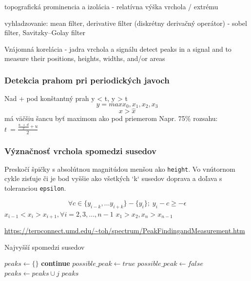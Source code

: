 topografická prominencia a izolácia - relatívna výška vrchola / extrému

vyhladzovanie: mean filter, derivative filter (diskrétny derivačný operátor) - sobel filter, Savitzky–Golay filter
\cite{spectrometry-peak-detection}

Vzájomná korelácia - jadra vrchola a signálu
detect peaks in a signal and to measure their positions, heights, widths, and/or areas


\subsubsection{Detekcia prahom pri periodických javoch}
Nad + pod konštantný prah y < t, y > t
$$ y = max{x_0, x_1, x_2, x_3}$$
$$ x > \hat{x} $$ má väčšiu šancu byť maximom ako pod priemerom
Napr. 75\% rozsahu: $t\ =\frac{\frac{u\ \ +\ d}{2}+u}{2}$

\subsubsection{Význačnosť vrchola spomedzi susedov}
Preskočí špičky s absolútnou magnitúdou menšou ako \verb|height|. Vo vnútornom cykle zisťuje či je bod vyššie ako všetkých `k` susedov doprava a doľava s toleranciou \verb|epsilon|.

\begin{equation}
\forall c \in \{y_{i-k}, ... y_{i+k}\} - \{y_i\}; \; y_i - c \geq -\epsilon
\end{equation}
\cite{survey-peaks-valleys} 
$ x_{i-1} < x_i > x_{i+1}, \forall i = 2, 3, ..., n - 1$
$ x_1 > x_2, x_n > x_{n-1}$

\url{https://terpconnect.umd.edu/~toh/spectrum/PeakFindingandMeasurement.htm}

\begin{algorithm}
\caption{Najvyšší spomedzi susedov}
\begin{algorithmic}[1]
	\State $peaks \gets \{\}$ 	
		  
			\State \textbf{continue}
		\EndIf
		\State $possible\_peak \gets true$
				\State $possible\_peak \gets false$     
			\EndIf
		\EndFor
			\State $peaks \gets peaks \cup {j}$
		\EndIf
	\EndFor
	\State \Return $peaks$
\EndFunction
\end{algorithmic}
\end{algorithm}

